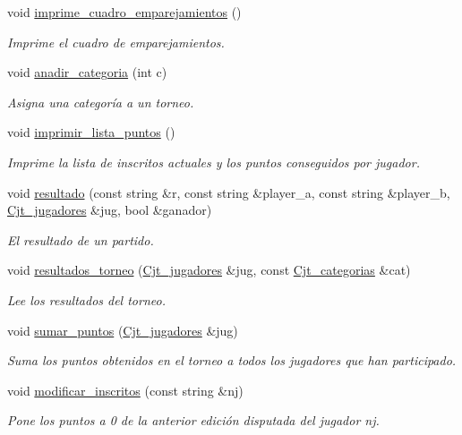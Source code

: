 \begin{DoxyCompactItemize}
void \hyperlink{class_torneo_adc22cda8d641ed9130e1171c4f8d5b84}{imprime\+\_\+cuadro\+\_\+emparejamientos} ()
\begin{DoxyCompactList}\small\item\em Imprime el cuadro de emparejamientos. \end{DoxyCompactList}\item 
void \hyperlink{class_torneo_a089468654daf52979cd7c393c51ceb85}{anadir\+\_\+categoria} (int c)
\begin{DoxyCompactList}\small\item\em Asigna una categoría a un torneo. \end{DoxyCompactList}\item 
void \hyperlink{class_torneo_ae5ed31026d55786a078666e4a7d4d62e}{imprimir\+\_\+lista\+\_\+puntos} ()
\begin{DoxyCompactList}\small\item\em Imprime la lista de inscritos actuales y los puntos conseguidos por jugador. \end{DoxyCompactList}\item 
void \hyperlink{class_torneo_ad3d497cf4a6eafce2c36160f464bbe03}{resultado} (const string \&r, const string \&player\+\_\+a, const string \&player\+\_\+b, \hyperlink{class_cjt__jugadores}{Cjt\+\_\+jugadores} \&jug, bool \&ganador)
\begin{DoxyCompactList}\small\item\em El resultado de un partido. \end{DoxyCompactList}\item 
void \hyperlink{class_torneo_a791793b8131e964b1387b84f849ae2cd}{resultados\+\_\+torneo} (\hyperlink{class_cjt__jugadores}{Cjt\+\_\+jugadores} \&jug, const \hyperlink{class_cjt__categorias}{Cjt\+\_\+categorias} \&cat)
\begin{DoxyCompactList}\small\item\em Lee los resultados del torneo. \end{DoxyCompactList}\item 
void \hyperlink{class_torneo_af3d9ca7a6edf9bbf20a2af3b60bf23fc}{sumar\+\_\+puntos} (\hyperlink{class_cjt__jugadores}{Cjt\+\_\+jugadores} \&jug)
\begin{DoxyCompactList}\small\item\em Suma los puntos obtenidos en el torneo a todos los jugadores que han participado. \end{DoxyCompactList}\item 
void \hyperlink{class_torneo_a89490159cb29ce076f955ebd1ef3a3bf}{modificar\+\_\+inscritos} (const string \&nj)
\begin{DoxyCompactList}\small\item\em Pone los puntos a 0 de la anterior edición disputada del jugador nj. \end{DoxyCompactList}\end{DoxyCompactItemize}
